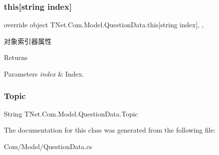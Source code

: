\subsubsection{\texorpdfstring{this[string index]}{this[string index]}}
{\footnotesize\ttfamily override object T\+Net.\+Com.\+Model.\+Question\+Data.\+this\mbox{[}string index\mbox{]}\hspace{0.3cm}{\ttfamily [get]}, {\ttfamily [set]}, {\ttfamily [protected]}}



对象索引器属性 

\begin{DoxyReturn}{Returns}

\end{DoxyReturn}

\begin{DoxyParams}{Parameters}
{\em index} & Index.\\
\hline
\end{DoxyParams}
\mbox{\label{class_t_net_1_1_com_1_1_model_1_1_question_data_aedde26404a46c823c1a4928d49568f56}} 
\subsubsection{\texorpdfstring{Topic}{Topic}}
{\footnotesize\ttfamily String T\+Net.\+Com.\+Model.\+Question\+Data.\+Topic\hspace{0.3cm}{\ttfamily [get]}}







The documentation for this class was generated from the following file\+:\begin{DoxyCompactItemize}
\item 
Com/\+Model/Question\+Data.\+cs\end{DoxyCompactItemize}
